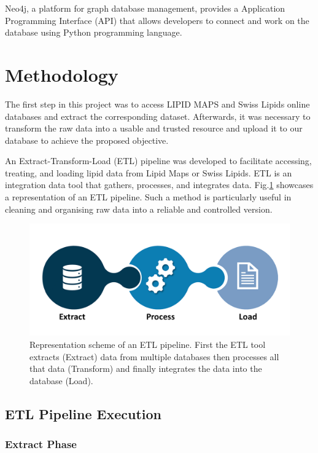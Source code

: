 \documentclass{llncs}
\begin{document}
Neo4j, a platform for graph database management, provides a Application Programming Interface (API) that allows developers to connect and work on the database using Python programming language.

\section{Methodology}

The first step in this project was to access LIPID MAPS and Swiss Lipids online databases and extract the corresponding dataset.
Afterwards, it was necessary to transform the raw data into a usable and trusted resource and upload it to our database to achieve the proposed objective.
 
An Extract-Transform-Load (ETL) pipeline was developed to facilitate accessing, treating, and loading lipid data from Lipid Maps or Swiss Lipids.
ETL is an integration data tool that gathers, processes, and integrates data. Fig.\ref{fig4} showcases a representation of an ETL pipeline. Such a method is particularly useful in cleaning and organising raw data into a reliable and controlled version. 

\begin{figure}
    \includegraphics[width=\textwidth]{imagens/ETL.png}
    \caption{Representation scheme of an ETL pipeline.
    First the ETL tool extracts (Extract) data from multiple databases
    then processes all that data (Transform)
    and finally integrates the data into the database (Load).} \label{fig4}    
\end{figure}

\subsection{ETL Pipeline Execution}
\subsubsection{Extract Phase}
\end{document}
